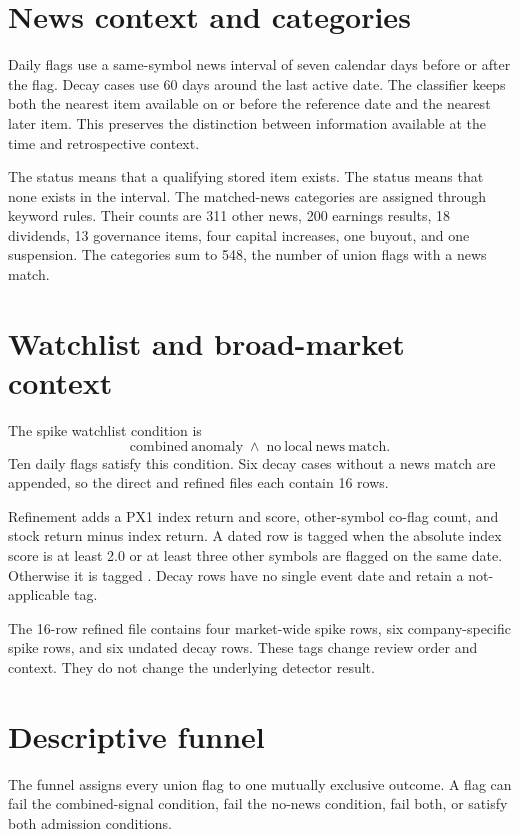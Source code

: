 \section{News context and categories}

Daily flags use a same-symbol news interval of seven calendar days before or
after the flag. Decay cases use 60 days around the last active date. The
classifier keeps both the nearest item available on or before the reference
date and the nearest later item. This preserves the distinction between
information available at the time and retrospective context.

The status  means that a qualifying stored item exists.
The status  means that none exists in the interval. The
matched-news categories are assigned through keyword rules. Their counts are
311 other news, 200 earnings results, 18 dividends, 13 governance items, four
capital increases, one buyout, and one suspension. The categories sum to 548,
the number of union flags with a news match.

\section{Watchlist and broad-market context}

The spike watchlist condition is
\[
 \mathrm{combined\ anomaly}\;\land\;\mathrm{no\ local\ news\ match}.
\]
Ten daily flags satisfy this condition. Six decay cases without a news match
are appended, so the direct and refined files each contain 16 rows.

Refinement adds a PX1 index return and score, other-symbol co-flag count, and
stock return minus index return. A dated row is tagged  when
the absolute index score is at least 2.0 or at least three other symbols are
flagged on the same date. Otherwise it is tagged .
Decay rows have no single event date and retain a not-applicable tag.

The 16-row refined file contains four market-wide spike rows, six
company-specific spike rows, and six undated decay rows. These tags change
review order and context. They do not change the underlying detector result.

\section{Descriptive funnel}

The funnel assigns every union flag to one mutually exclusive outcome. A flag
can fail the combined-signal condition, fail the no-news condition, fail both,
or satisfy both admission conditions.

